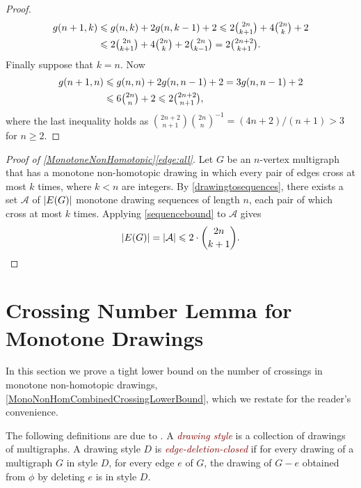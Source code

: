 \documentclass[a4paper,11pt]{article}
\renewcommand{\geq}{\geqslant}
\renewcommand{\leq}{\leqslant}
\DeclarePairedDelimiter{\abs}{\lvert}{\rvert} %
\newcommand{\defn}[1]{\textcolor{Maroon}{\emph{#1}}}
\renewcommand{\AA}{\mathcal{A}}
\begin{document}
\begin{proof}
    \begin{align*}
        g(n + 1, k) & \leq g(n, k) + 2g(n, k - 1) + 2 \leq 2 \tbinom{2n}{k + 1} + 4 \tbinom{2n}{k} + 2 \\
        & \leq 2 \tbinom{2n}{k + 1} + 4 \tbinom{2n}{k} + 2 \tbinom{2n}{k - 1} = 2 \tbinom{2n + 2}{k + 1}.
    \end{align*}
    Finally suppose that $k = n$. Now
    \begin{align*}
        g(n + 1, n) & \leq g(n, n) + 2g(n, n - 1) + 2 = 3g(n, n - 1) + 2 \\
        & \leq 6 \tbinom{2n}{n} + 2 \leq 2 \tbinom{2n + 2}{n + 1},
    \end{align*}
    where the last inequality holds as $\binom{2n + 2}{n + 1} \binom{2n}{n}^{-1} = (4n + 2)/(n + 1) > 3$ for $n \geq 2$.
\end{proof}

\begin{proof}[Proof of \cref{MonotoneNonHomotopic}\ref{edge:all}]
    Let $G$ be an $n$-vertex multigraph that has a monotone non-homotopic drawing in which every pair of edges cross at most $k$ times, where $k < n$ are integers. By \cref{drawingtosequences}, there exists a set $\AA$ of $\abs{E(G)}$ monotone drawing sequences of length $n$, each pair of which cross at most $k$ times. Applying \cref{sequencebound} to $\AA$ gives
    \begin{equation*}
        \abs{E(G)} = \abs{\AA} \leq 2 \cdot \binom{2n}{k + 1}. \qedhere
    \end{equation*}
\end{proof}


\section{Crossing Number Lemma for Monotone Drawings}\label{sec:crossing}

In this section we prove a tight lower bound on the number of crossings in monotone non-homotopic drawings, \cref{MonoNonHomCombinedCrossingLowerBound}, which we restate for the reader's convenience.

\MonoNonHomCombined*

The following definitions are due to \citet*{KPTU21}. A \defn{drawing style} is a collection of drawings of multigraphs. A drawing style $D$ is \defn{edge-deletion-closed} if for every drawing of a multigraph $G$ in style $D$, for every edge $e$ of $G$, the drawing of $G-e$ obtained from $\phi$ by deleting $e$ is in style $D$. 
\end{document}
